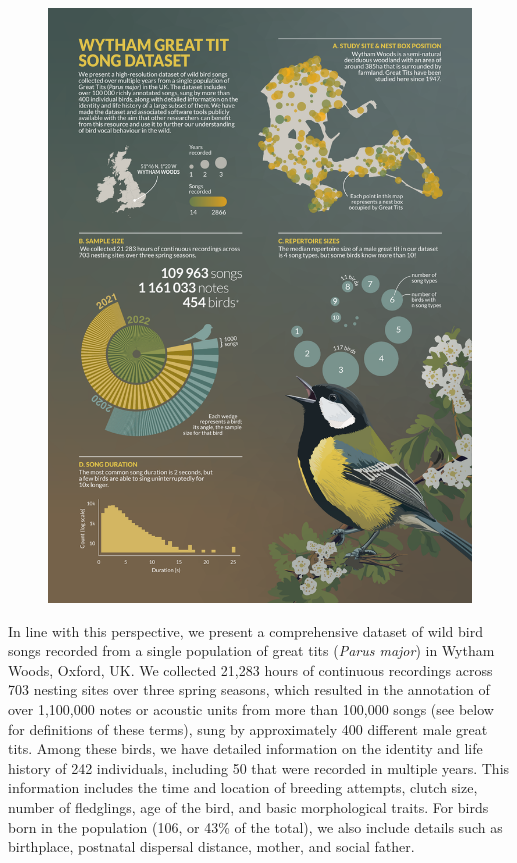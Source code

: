 \begin{figure}[htbp]
    \centering
    \includegraphics[width=\linewidth]{figures/chapter_3/FIG1-AB.pdf}%
    \label{c3_fig:summary}
\end{figure}


In line with this perspective, we present a comprehensive dataset of wild bird songs recorded from a single population of great tits (\textit{Parus major}) in Wytham Woods, Oxford, UK. We collected 21,283 hours of continuous recordings across 703 nesting sites over three spring seasons, which resulted in the annotation of over 1,100,000 notes or acoustic units from more than 100,000 songs (see below for definitions of these terms), sung by approximately 400 different male great tits. Among these birds, we have detailed information on the identity and life history of 242 individuals, including 50 that were recorded in multiple years. This information includes the time and location of breeding attempts, clutch size, number of fledglings, age of the bird, and basic morphological traits. For birds born in the population (106, or 43\% of the total), we also include details such as birthplace, postnatal dispersal distance, mother, and social father. 

